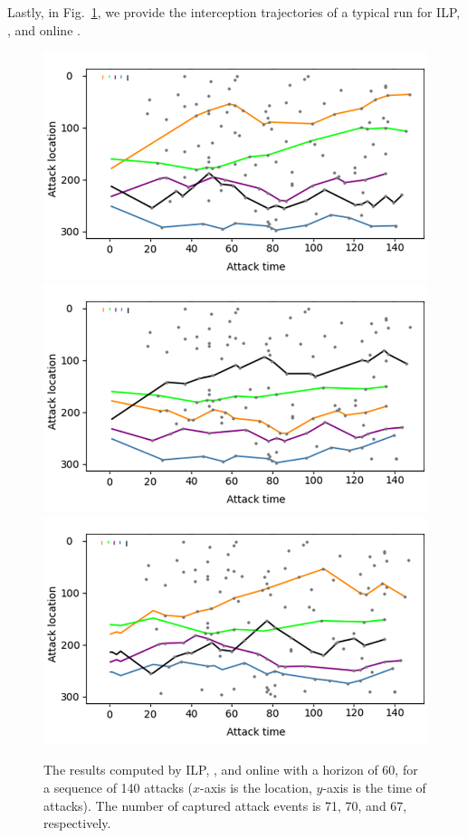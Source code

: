 Lastly, in Fig.~\ref{fig:solution_examples}, we provide the interception trajectories of a typical run for ILP,  \ours, and online \ours. 
\begin{figure}[h!]
    \vspace{1mm}
    \centering
    \includegraphics[width=\linewidth]{chapters/pd/fig/ilp_example-v.png}
    \includegraphics[width=\linewidth]{chapters/pd/fig/ls_example-v.png}
    \includegraphics[width=\linewidth]{chapters/pd/fig/inf_horizon_example-v.png}
    \caption{The results computed by ILP, \ours, and online \ours with a horizon of 60, for a sequence of 140 attacks ($x$-axis is the location, $y$-axis is the time of attacks). 
    The number of captured attack events is 71, 70, and 67, respectively.}
    \label{fig:solution_examples}
    \vspace{-4mm}
\end{figure}
